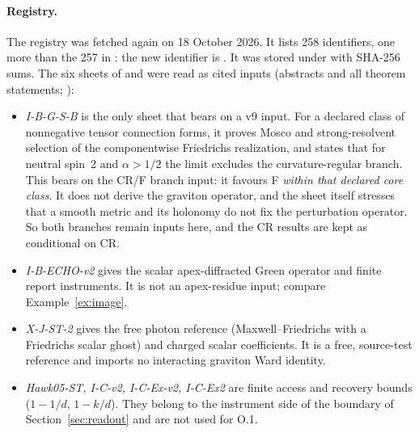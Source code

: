 \paragraph{Registry.} The registry was fetched again on 18 October
2026. It lists 258 identifiers, one more than the 257 in
: the new identifier is . It was
stored under  with SHA-256 sums. The six sheets
of  and  were read as cited inputs
(abstracts and all theorem statements; ):
\begin{itemize}
\item \emph{I-B-G-S-B} \cite{CheungIBGSBv9} is the only sheet that
bears on a v9 input. For a declared class of nonnegative tensor
connection forms, it proves Mosco and strong-resolvent selection of
the componentwise Friedrichs realization, and states that for
neutral spin~2 and \(\alpha>1/2\) the limit excludes the
curvature-regular branch. This bears on the CR/F branch input: it
favours F \emph{within that declared core class}. It does not
derive the graviton operator, and the sheet itself stresses that a
smooth metric and its holonomy do not fix the perturbation
operator. So both branches remain inputs here, and the CR results
are kept as conditional on CR.
\item \emph{I-B-ECHO-v2} \cite{CheungEchoV2} gives the scalar
apex-diffracted Green operator and finite report instruments. It
is not an apex-residue input; compare Example~\ref{ex:image}.
\item \emph{X-J-ST-2} \cite{CheungXJST2} gives the free photon
reference (Maxwell--Friedrichs with a Friedrichs scalar ghost) and
charged scalar coefficients. It is a free, source-test reference
and imports no interacting graviton Ward identity.
\item \emph{Hawk05-ST, I-C-v2, I-C-Ex-v2, I-C-Ex2}
\cite{CheungHawk05ST,CheungICv2,CheungICExv2,CheungICEx2} are
finite access and recovery bounds (\(1-1/d\), \(1-k/d\)). They
belong to the instrument side of the boundary of
Section~\ref{sec:readout} and are not used for O.1.
\end{itemize}

